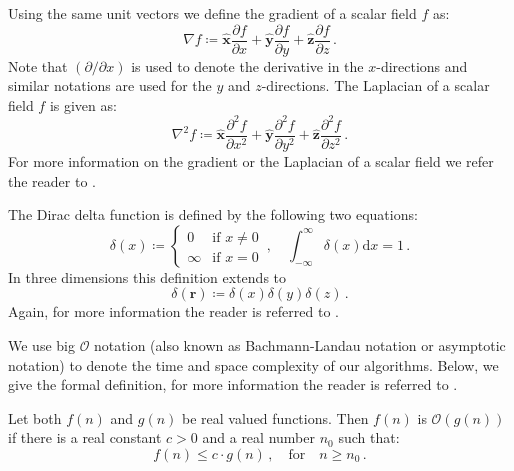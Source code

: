 Using the same unit vectors we define the gradient of a scalar field $f$ as:
\begin{equation}
    \nabla f \coloneq \mathbf{\hat x} \frac{\partial f}{\partial x} + \mathbf{\hat y} \frac{\partial f}{\partial y} + \mathbf{\hat z} \frac{\partial f}{\partial z} \,. \nonumber
\end{equation}
Note that $(\partial/\partial x)$ is used to denote the derivative in the $x$-directions and similar notations are used for the $y$ and $z$-directions.
The Laplacian of a scalar field $f$ is given as:
\begin{equation}
    \nabla^2 f \coloneq \mathbf{\hat x} \frac{\partial^2 f}{\partial x^2} + \mathbf{\hat y} \frac{\partial^2 f}{\partial y^2} + \mathbf{\hat z} \frac{\partial^2 f}{\partial z^2} \,. \nonumber
\end{equation}
For more information on the gradient or the Laplacian of a scalar field we refer the reader to \citeauthor{electrodynamics} \cite[Sections 1.2.3-1.2.7]{electrodynamics}.

The Dirac delta function is defined by the following two equations:
\begin{equation}
    \delta(x) \coloneq \begin{cases} 0 & \textrm{if } x\neq 0\\ \infty & \textrm{if } x=0\end{cases} \,, \quad
    \int_{-\infty}^\infty \delta(x) \mathrm d x = 1 \,. \nonumber
\end{equation}
In three dimensions this definition extends to
\begin{equation}
    \delta(\mathbf r) \coloneq \delta(x) \delta(y) \delta(z) \,. \nonumber
\end{equation}
Again, for more information the reader is referred to \citeauthor{electrodynamics} \cite[Sections 1.5.1-1.5.3]{electrodynamics}.

We use big $\mathcal O$ notation (also known as Bachmann-Landau notation or asymptotic notation) to denote the time and space complexity of our algorithms.
Below, we give the formal definition, for more information the reader is referred to \citeauthor{bigOnotation} \cite[Section 4.3]{bigOnotation}.
\begin{tcolorbox}[sharp corners, colback=white]
    Let both $f(n)$ and $g(n)$ be real valued functions. Then $f(n)$ is $\mathcal O(g(n))$ if there is a real constant $c>0$ and a real number $n_0$ such that:
    \begin{equation}
        f(n) \leq c \cdot g(n) \,, \quad \textrm{for} \quad n \geq n_0 \,. \nonumber
    \end{equation}
\end{tcolorbox}

